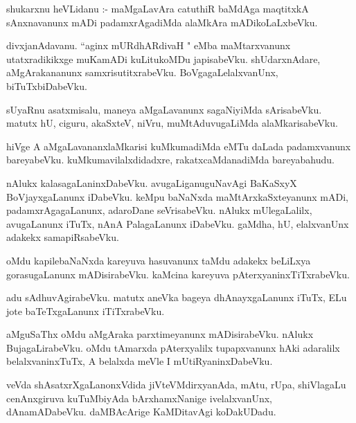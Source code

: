 \documentclass{article}
\begin{document}
\begin{mn}
shukarxnu  heVLidanu :- maMgaLavAra  catuthiR  baMdAga  maqtitxkA  sAnxnavanunx  mADi  
padamxrAgadiMda  alaMkAra  mADikoLaLxbeVku.
\end{mn}

\begin{mn}
divxjanAdavanu.  ``aginx mURdhARdivaH "  eMba  maMtarxvanunx  utatxradikikxge  muKamADi  kuLitukoMDu  
japisabeVku.  shUdarxnAdare,  aMgArakananunx  samxrisutitxrabeVku.  BoVgagaLelalxvanUnx,  biTuTxbiDabeVku.
\end{mn}

\begin{mn}
sUyaRnu  asatxmisalu,  maneya  aMgaLavanunx  sagaNiyiMda  sArisabeVku.  matutx  hU,  
ciguru,  akaSxteV,  niVru,  muMtAduvugaLiMda  alaMkarisabeVku.
\end{mn}

\begin{mn}
hiVge  A  aMgaLavananxlaMkarisi  kuMkumadiMda  eMTu  daLada  padamxvanunx  bareyabeVku.      
kuMkumavilalxdidadxre,  rakatxcaMdanadiMda  bareyabahudu.
\end{mn}

\begin{mn}
nAlukx  kalasagaLaninxDabeVku.  avugaLiganuguNavAgi  BaKaSxyX BoVjayxgaLanunx  iDabeVku.  keMpu  baNaNxda  
maMtArxkaSxteyanunx  mADi,  padamxrAgagaLanunx,  adaroDane  seVrisabeVku.  nAlukx  mUlegaLalilx,  
avugaLanunx  iTuTx,  nAnA  PalagaLanunx  iDabeVku.  gaMdha,  hU,  elalxvanUnx  adakekx  samapiRsabeVku.
\end{mn}

\begin{mn}
oMdu  kapilebaNaNxda  kareyuva  hasuvanunx  taMdu  adakekx  beLiLxya  gorasugaLanunx  mADisirabeVku.  
kaMcina  kareyuva  pAterxyaninxTiTxrabeVku.
\end{mn}

\begin{mn}
adu  sAdhuvAgirabeVku.  matutx  aneVka  bageya  dhAnayxgaLanunx  iTuTx,  ELu jote  baTeTxgaLanunx  iTiTxrabeVku.
\end{mn}

\begin{mn}
aMguSaThx  oMdu  aMgAraka  parxtimeyanunx  mADisirabeVku.  nAlukx  BujagaLirabeVku.  oMdu  tAmarxda  pAterxyalilx  
tupapxvanunx  hAki  adaralilx  belalxvaninxTuTx,  A  belalxda  meVle  I  mUtiRyaninxDabeVku.
\end{mn}

\begin{mn}
veVda  shAsatxrXgaLanonxVdida  jiVteVMdirxyanAda,  mAtu,  rUpa,  shiVlagaLu  cenAnxgiruva  
kuTuMbiyAda  bArxhamxNanige  ivelalxvanUnx,  dAnamADabeVku.  daMBAcArige  KaMDitavAgi  koDakUDadu.
\end{mn}
\end{document}
